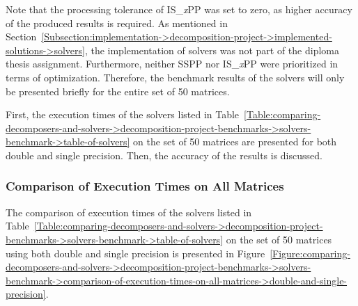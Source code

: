 Note that the processing tolerance of IS\_\textit{x}PP was set to zero, as higher accuracy of the produced results is required.
As mentioned in Section~\ref{Subsection:implementation->decomposition-project->implemented-solutions->solvers}, the implementation of solvers was not part of the diploma thesis assignment.
Furthermore, neither SSPP nor IS\_\textit{x}PP were prioritized in terms of optimization.
Therefore, the benchmark results of the solvers will only be presented briefly for the entire set of 50 matrices.

First, the execution times of the solvers listed in Table~\ref{Table:comparing-decomposers-and-solvers->decomposition-project-benchmarks->solvers-benchmark->table-of-solvers} on the set of 50 matrices are presented for both double and single precision.
Then, the accuracy of the results is discussed.


\subsubsection{Comparison of Execution Times on All Matrices}
The comparison of execution times of the solvers listed in Table~\ref{Table:comparing-decomposers-and-solvers->decomposition-project-benchmarks->solvers-benchmark->table-of-solvers} on the set of 50 matrices using both double and single precision is presented in Figure~\ref{Figure:comparing-decomposers-and-solvers->decomposition-project-benchmarks->solvers-benchmark->comparison-of-execution-times-on-all-matrices->double-and-single-precision}.


